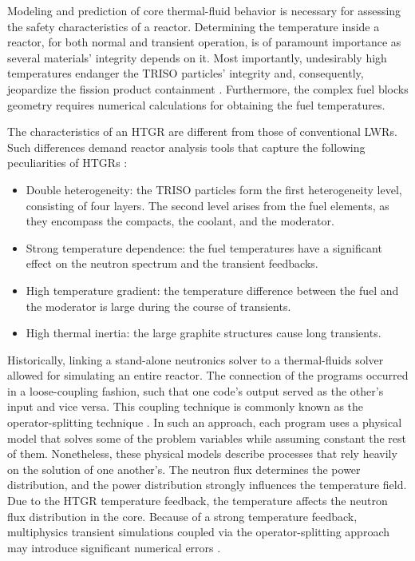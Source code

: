 Modeling and prediction of core thermal-fluid behavior is necessary for assessing the safety characteristics of a reactor.
Determining the temperature inside a reactor, for both normal and transient operation, is of paramount importance as several materials' integrity depends on it.
Most importantly, undesirably high temperatures endanger the TRISO particles' integrity and, consequently, jeopardize the fission product containment \cite{tak_numerical_2008}.
Furthermore, the complex fuel blocks geometry requires numerical calculations for obtaining the fuel temperatures.

The characteristics of an \gls{HTGR} are different from those of conventional \glspl{LWR}.
Such differences demand reactor analysis tools that capture the following peculiarities of \glspl{HTGR} \cite{rohde_development_2012}\cite{bostelmann_criticality_2016}:
\begin{itemize}
\item Double heterogeneity: the TRISO particles form the first heterogeneity level, consisting of four
layers.
The second level arises from the fuel elements, as they encompass the compacts, the coolant, and the moderator.
\item Strong temperature dependence: the fuel temperatures have a significant effect on the neutron spectrum and the transient feedbacks.
\item High temperature gradient: the temperature difference between the fuel and the moderator is large during the course of transients.
\item High thermal inertia: the large graphite structures cause long transients.
\end{itemize}

Historically, linking a stand-alone neutronics solver to a thermal-fluids solver allowed for simulating an entire reactor.
The connection of the programs occurred in a loose-coupling fashion, such that one code's output served as the other's input and vice versa.
This coupling technique is commonly known as the operator-splitting technique \cite{ragusa_consistent_2009}.
In such an approach, each program uses a physical model that solves some of the problem variables while assuming constant the rest of them.
Nonetheless, these physical models describe processes that rely heavily on the solution of one another's.
The neutron flux determines the power distribution, and the power distribution strongly influences the temperature field.
Due to the \gls{HTGR} temperature feedback, the temperature affects the neutron flux distribution in the core.
Because of a strong temperature feedback, multiphysics transient simulations coupled via the operator-splitting approach may introduce significant numerical errors \cite{park_tightly_2010}\cite{ragusa_consistent_2009}.


